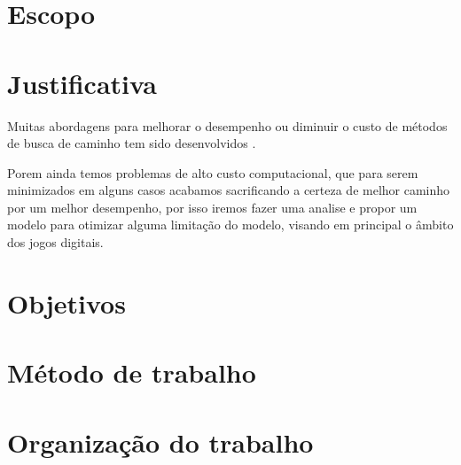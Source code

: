 \section{Escopo}



\section{Justificativa}

Muitas abordagens para melhorar o desempenho ou diminuir o custo de métodos de busca de caminho tem sido desenvolvidos \cite{Ulysses}  \cite{Pollack} \cite{Pollack} \cite{Timothy} \cite{WilliamMiller}. 

Porem ainda temos problemas de alto custo computacional, que para serem minimizados em alguns casos acabamos sacrificando a certeza de melhor caminho \cite{Botea} por um melhor desempenho, por isso iremos fazer uma analise e propor um modelo para otimizar alguma limitação do modelo, visando em principal o âmbito dos jogos digitais.

\section{Objetivos}


\section{Método de trabalho}


\section{Organização do trabalho}


